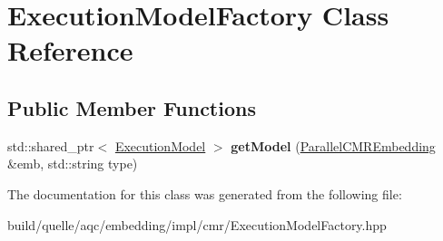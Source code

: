 \hypertarget{a00056}{}\section{Execution\+Model\+Factory Class Reference}
\label{a00056}
\subsection*{Public Member Functions}
\begin{DoxyCompactItemize}
\item 
std\+::shared\+\_\+ptr$<$ \hyperlink{a00054}{Execution\+Model} $>$ {\bfseries get\+Model} (\hyperlink{a00092}{Parallel\+C\+M\+R\+Embedding} \&emb, std\+::string type)\hypertarget{a00056_a8b5453eff94d48d1b31dfb5b1c8f705d}{}\label{a00056_a8b5453eff94d48d1b31dfb5b1c8f705d}

\end{DoxyCompactItemize}


The documentation for this class was generated from the following file\+:\begin{DoxyCompactItemize}
\item 
build/quelle/aqc/embedding/impl/cmr/\+Execution\+Model\+Factory.\+hpp\end{DoxyCompactItemize}

